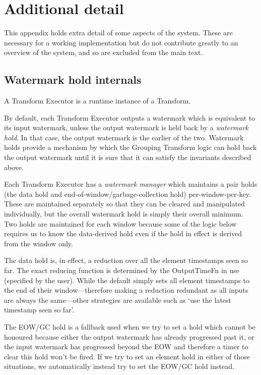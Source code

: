 \chapter{Additional detail}\label{apx:aditional}

This appendix holds extra detail of some aspects of the system.
These are necessary for a working implementation but do not contribute greatly to an overview of the system, and so are excluded from the main text.

\section{Watermark hold internals}\label{apx:additional:watermark-holds}

A Transform Executor is a runtime instance of a Transform.

By default, each Transform Executor outputs a watermark which is equivalent to its input watermark, unless the output watermark is held back by a \emph{watermark hold}.
In that case, the output watermark is the earlier of the two.
Watermark holds provide a mechanism by which the Grouping Transform logic can hold back the output watermark until it is sure that it can satisfy the invariants described above.

Each Transform Executor has a \emph{watermark manager} which maintains a pair holds (the data hold and end-of-window/garbage-collection hold) per-window-per-key.
These are maintained separately so that they can be cleared and manipulated individually, but the overall watermark hold is simply their overall minimum.
Two holds are maintained for each window because some of the logic below requires us to know the data-derived hold even if the hold in effect is derived from the window only.

The data hold is, in effect, a reduction over all the element timestamps seen so far.
The exact reducing function is determined by the OutputTimeFn in use (specified by the user).
While the default simply sets all element timestamps to the end of their window---therefore making a reduction redundant as all inputs are always the same---other strategies are available such as `use the latest timestamp seen so far'.

The EOW/GC hold is a fallback used when we try to set a hold which cannot be honoured because either the output watermark has already progressed past it, or the input watermark has progressed beyond the EOW and therefore a timer to clear this hold won't be fired.
If we try to set an element hold in either of those situations, we automatically instead try to set the EOW/GC hold instead.

